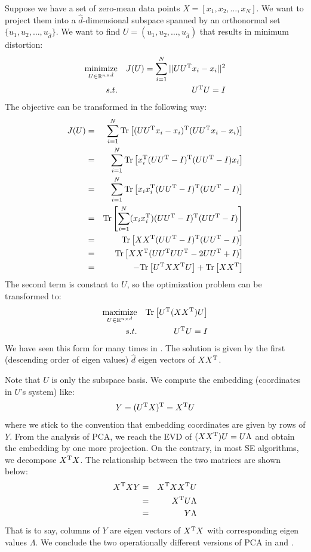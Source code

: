 Suppose we have a set of zero-mean
data points $X = [x_1, x_2, \ldots, x_N]$. We want to project 
them into a $ \hat{d} $-dimensional subspace spanned by
an orthonormal set 
$ \{u_1, u_2, \ldots, u_{\hat{d}}\} $. We want to find 
$ U = (u_1, u_2, \ldots, u_{\hat{d}}) $ that results 
in minimum distortion:
\begin{eqnarray}
	\operatorname*{minimize}_{U \in \mathbb{R}^{n \times \hat{d}}} 
	&& { J(U) = \sum_{i=1}^{N}{||UU^\mathrm{T}x_i - x_i||^2} } \nonumber \\
	s.t. && U^\mathrm{T}U = I
\end{eqnarray}
The objective can be transformed in the following way:
\begin{eqnarray}
	J(U) &=& \sum_{i=1}^{N} \mathrm{Tr}\left[ (UU^\mathrm{T}x_i - x_i) ^\mathrm{T}(UU^\mathrm{T}x_i - x_i) \right]  \\
	&=& \sum_{i=1}^{N} \mathrm{Tr}\left[ x_i^\mathrm{T} (UU^\mathrm{T}-I)^\mathrm{T}(UU^\mathrm{T}-I)  x_i \right] \\
	&=&  \sum_{i=1}^{N} \mathrm{Tr}\left[  x_i x_i^\mathrm{T} (UU^\mathrm{T}-I)^\mathrm{T}(UU^\mathrm{T}-I)  \right] \\
	&=&   \mathrm{Tr}\left[  \sum_{i=1}^{N}(x_i x_i^\mathrm{T}) (UU^\mathrm{T}-I)^\mathrm{T}(UU^\mathrm{T}-I)  \right] \\
	&=&   \mathrm{Tr}\left[  XX^\mathrm{T} (UU^\mathrm{T}-I)^\mathrm{T}(UU^\mathrm{T}-I)  \right] \\
	&=&   \mathrm{Tr}\left[  XX^\mathrm{T} (UU^\mathrm{T}UU^\mathrm{T} - 2 UU^\mathrm{T} + I)  \right] \\
	&=& -\mathrm{Tr}\left[  U^\mathrm{T}XX^\mathrm{T} U\right] + \mathrm{Tr}\left[XX^\mathrm{T}\right]
\end{eqnarray}
The second term is constant to $ U $, so the optimization problem 
can be transformed to:
\begin{eqnarray}
	\operatorname*{maximize}_{U \in \mathbb{R}^{n \times \hat{d}}} 
	&& { \mathrm{Tr}\left[  U^\mathrm{T}(XX^\mathrm{T}) U\right] } \nonumber \\
	s.t. && U^\mathrm{T}U = I
\end{eqnarray}
We have seen this form for many times in \rsec{\ref{sec:combinatoric}}. 
The solution is given by the first 
(descending order of eigen values) $ \hat{d} $ eigen vectors of 
$ XX^\mathrm{T} $. 

Note that $ U $ is only the subspace basis. We compute the embedding
(coordinates in $ U $'s system) like:
\begin{equation}
	Y = (U^\mathrm{T}X)^\mathrm{T} = X^\mathrm{T} U
\end{equation}
where we stick to the convention that embedding coordinates are given 
by rows of $ Y $. From the analysis of PCA, we reach the EVD of
$ (XX^\mathrm{T})U = U \Lambda $ and obtain the embedding 
by one more projection. On the contrary, in most SE algorithms, 
we decompose $ X^\mathrm{T}X $. The relationship between the two matrices 
are shown below:
\begin{eqnarray}
	X^\mathrm{T}X Y &=& X^\mathrm{T}X X^\mathrm{T} U \nonumber \\
	&=& X^\mathrm{T} U \Lambda \nonumber \\
	&=& Y \Lambda
\end{eqnarray}
That is to say, columns of $ Y $ are eigen vectors of  $ X^\mathrm{T}X $
with corresponding eigen values $ \Lambda $. We conclude 
the two operationally different versions of PCA in 
\ralg{\ref{alg:pca_cov}} and \ralg{\ref{alg:pca_in}}. 

